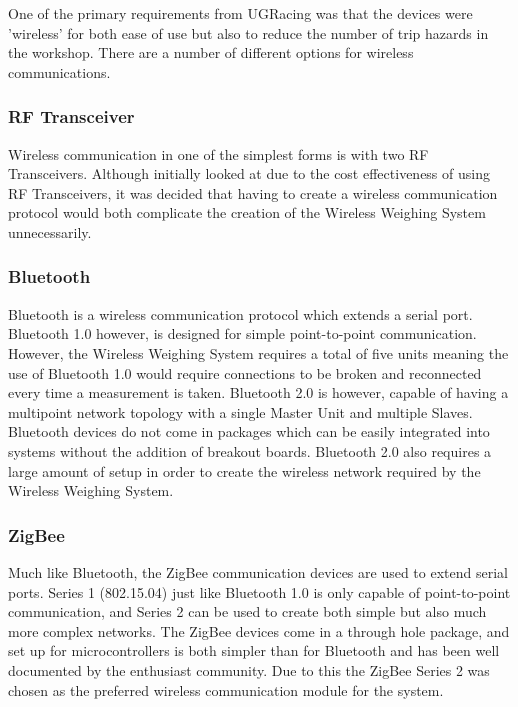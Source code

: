 One of the primary requirements from UGRacing was that the devices were 'wireless' for both ease of use but also to reduce the number of trip hazards in the workshop. There are a number of different options for wireless communications.
\subsubsection{RF Transceiver}
Wireless communication in one of the simplest forms is with two RF Transceivers. Although initially looked at due to the cost effectiveness of using RF Transceivers, it was decided that having to create a wireless communication protocol would both complicate the creation of the Wireless Weighing System unnecessarily.
\subsubsection{Bluetooth}
Bluetooth is a wireless communication protocol which extends a serial port. Bluetooth 1.0 however, is designed for simple point-to-point communication. However, the Wireless Weighing System requires a total of five units meaning the use of Bluetooth 1.0 would require connections to be broken and reconnected every time a measurement is taken.  Bluetooth 2.0 is however, capable of having a multipoint network topology with a single Master Unit and multiple Slaves. Bluetooth devices do not come in packages which can be easily integrated into systems without the addition of breakout boards. Bluetooth 2.0 also requires a large amount of setup in order to create the wireless network required by the Wireless Weighing System.
\subsubsection{ZigBee}
Much like Bluetooth, the ZigBee communication devices are used to extend serial ports. Series 1 (802.15.04) just like Bluetooth 1.0 is only capable of point-to-point communication, and Series 2 can be used to create both simple but also much more complex networks. The ZigBee devices come in a through hole package, and set up for microcontrollers is both simpler than for Bluetooth and has been well documented by the enthusiast community. Due to this the ZigBee Series 2 was chosen as the preferred wireless communication module for the system.
